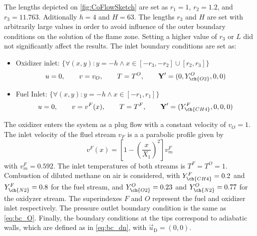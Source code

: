 The lengths  depicted on \cref{fig:CoFlowSketch} are set as $ r_1 = 1$, $ r_2 = 1.2$, and $ r_3 = 11.763$. Aditionally $ h = 4$ and $ H = 63$. The lengths $ r_3$ and $H$ are set with arbitrarily large values in order to avoid influence of the outer boundary conditions on the solution of the flame zone. Setting a higher value of $ r_3$ or $ L$ did not significantly affect the results. The inlet boundary conditions are set as: 
\begin{itemize}
	\item Oxidizer inlet: $\{\forall (x,y): y = -h \land x \in [-r_3,-r_2]\cup[r_2,r_3]\}$\\
	\begin{equation*}
		u = 0,\qquad v= v_O, \qquad T = T^O, \qquad \vec{Y}' = (0,Y^O_{\ch{O2}},0,0)
	\end{equation*}
\item Fuel Inlet: $\{\forall (x,y): y = -h \land x \in [-r_1,r_1]\} $ \\
\begin{equation*}
	u = 0,\qquad v= v^F(x), \qquad T = T^F, \qquad \vec{Y}' = (Y^F_{\ch{CH4}},0,0,0)
\end{equation*}
\end{itemize}
The oxidizer enters the system as a plug flow with a constant velocity of $v_O = 1 $. The inlet velocity of the fluel stream $v_F$ is a a parabolic profile given by
\begin{equation}
	v^F(x) = \left[1-\left(\frac{x}{X_1}\right)^2\right]v_m^F
\end{equation}
with $v^F_m =0.592$.  The inlet temperatures of both streams is  $T^F = T^O = 1$. Combustion of diluted methane on air is considered, with $Y^F_{\ch{CH4}} = 0.2$ and $Y^F_{\ch{N2}} = 0.8$ for the fuel stream, and  $Y^O_{\ch{O2}} = 0.23$ and $Y^O_{\ch{N2}} = 0.77$ for the oxidyzer stream. The superindexes $F$ and $O$ represent the fuel and oxidizer inlet respectively. The pressure outlet boundary condition is the same as \cref{eq:bc_O}. Finally, the boundary conditions at the tips correspond to adiabatic walls, which are defined as in \cref{eq:bc_dn}, with $\vec{u}_{\text{D}} = (0,0)$.             

